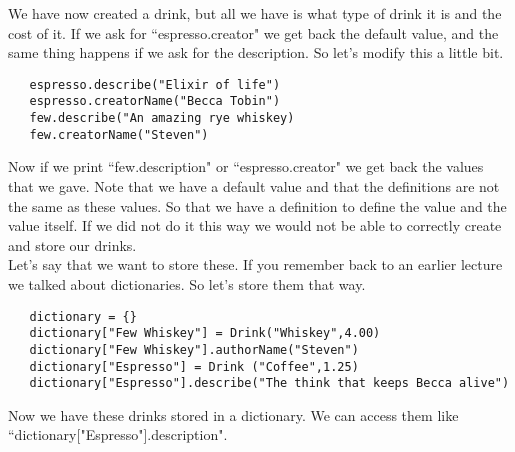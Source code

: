\documentclass[11pt]{article}   %
\begin{document}
We have now created a drink, but all we have is what type of drink it is and the cost of it.  If we ask for ``espresso.creator" we get back the default value,
and the same thing happens if we ask for the description.  So let's modify this a little bit.
\begin{tcolorbox}
   \begin{lstlisting}
   espresso.describe("Elixir of life")
   espresso.creatorName("Becca Tobin")
   few.describe("An amazing rye whiskey)
   few.creatorName("Steven")
   \end{lstlisting}
\end{tcolorbox}
Now if we print ``few.description" or ``espresso.creator" we get back the values that we gave.  Note that we have a default value and that the 
definitions are not the same as these values.  So that we have a definition to define the value and the value itself.  If we did not do it this way we
would not be able to correctly create and store our drinks.
\\
Let's say that we want to store these.  If you remember back to an earlier lecture we talked about dictionaries.  So let's store them that way.
\begin{tcolorbox}
   \begin{lstlisting}
   dictionary = {}
   dictionary["Few Whiskey"] = Drink("Whiskey",4.00)
   dictionary["Few Whiskey"].authorName("Steven")
   dictionary["Espresso"] = Drink ("Coffee",1.25)
   dictionary["Espresso"].describe("The think that keeps Becca alive")
   \end{lstlisting}
\end{tcolorbox}
Now we have these drinks stored in a dictionary.  We can access them like ``dictionary["Espresso"].description".  
\end{document}
